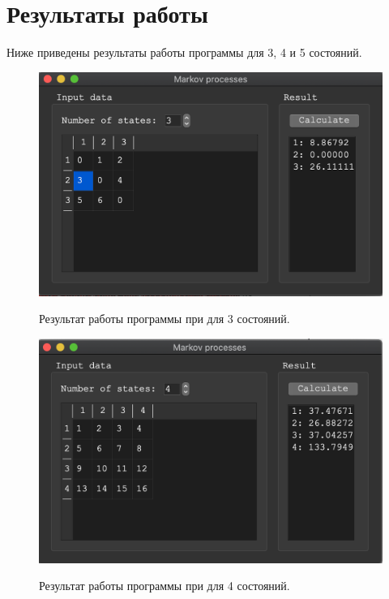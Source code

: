 \documentclass[a4paper,12pt]{article}
\begin{document}
	
	\newpage
	
	\section*{Результаты работы}
	
	Ниже приведены результаты работы программы для 3, 4 и 5 состояний.
	
	\begin{figure}[h!]
		\begin{center}
			{\includegraphics[scale = 0.7]{3.png}}
			\label{ris:1}
		\end{center}
		\caption{Результат работы программы при для 3 состояний.}
	\end{figure}

	\begin{figure}[h!]
		\begin{center}
			{\includegraphics[scale = 0.7]{4.png}}
			\label{ris:2}
		\end{center}
		\caption{Результат работы программы при для 4 состояний.}
	\end{figure}
\end{document}
